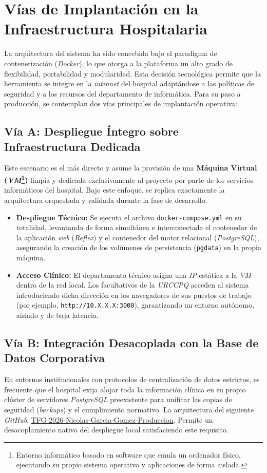 \section{Vías de Implantación en la Infraestructura Hospitalaria}
La arquitectura del sistema ha sido concebida bajo el paradigma de contenerización (\textit{Docker}), lo que otorga a la plataforma un alto grado de flexibilidad, portabilidad y modularidad. Esta decisión tecnológica permite que la herramienta se integre en la \textit{intranet} del hospital adaptándose a las políticas de seguridad y a los recursos del departamento de informática. Para su paso a producción, se contemplan dos vías principales de implantación operativa:

\subsection{Vía A: Despliegue Íntegro sobre Infraestructura Dedicada}
Este escenario es el más directo y asume la provisión de una \textbf{Máquina Virtual (\textit{VM}\footnote{Entorno informático basado en software que emula un ordenador físico, ejecutando su propio sistema operativo y aplicaciones de forma aislada.})} limpia y dedicada exclusivamente al proyecto por parte de los servicios informáticos del hospital. Bajo este enfoque, se replica exactamente la arquitectura orquestada y validada durante la fase de desarrollo.

\begin{itemize}
    \item \textbf{Despliegue Técnico:} Se ejecuta el archivo \texttt{docker-compose.yml} en su totalidad, levantando de forma simultánea e interconectada el contenedor de la aplicación \textit{web} (\textit{Reflex}) y el contenedor del motor relacional (\textit{PostgreSQL}), asegurando la creación de los volúmenes de persistencia (\texttt{pgdata}) en la propia máquina.
    \item \textbf{Acceso Clínico:} El departamento técnico asigna una \textit{IP} estática a la \textit{VM} dentro de la red local. Los facultativos de la \textit{URCCPQ} acceden al sistema introduciendo dicha dirección en los navegadores de sus puestos de trabajo (por ejemplo, \texttt{http://10.X.X.X:3000}), garantizando un entorno autónomo, aislado y de baja latencia.
\end{itemize}

\subsection{Vía B: Integración Desacoplada con la Base de Datos Corporativa}
En entornos institucionales con protocolos de centralización de datos estrictos, es frecuente que el hospital exija alojar toda la información clínica en su propio clúster de servidores \textit{PostgreSQL} preexistente para unificar las copias de seguridad (\textit{backups}) y el cumplimiento normativo. La arquitectura del siguiente \textit{GitHub}: \href{https://github.com/ngg1017/TFG-2026-Nicolas-Garcia-Gomez-Produccion}{TFG-2026-Nicolas-Garcia-Gomez-Produccion}. Permite un desacoplamiento nativo del despliegue local satisfaciendo este requisito.

